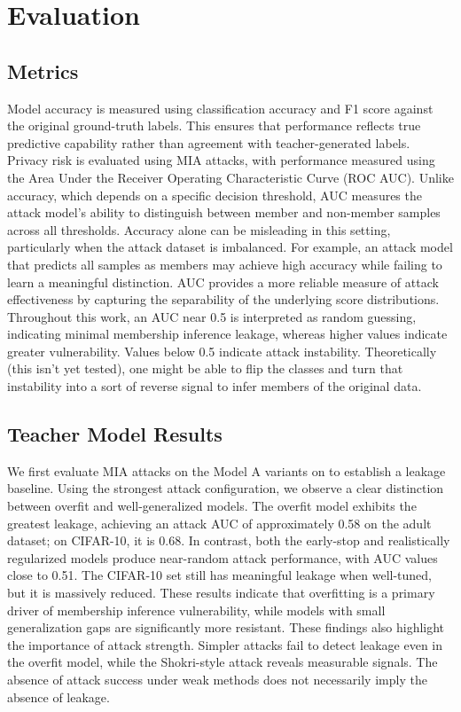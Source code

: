 \documentclass[conference]{IEEEtran}
\begin{document}
\section{Evaluation}

\subsection{Metrics}
Model accuracy is measured using classification accuracy and F1 score against the original ground-truth labels. This ensures that performance reflects true predictive capability rather than agreement with teacher-generated labels.
Privacy risk is evaluated using MIA attacks, with performance measured using the Area Under the Receiver Operating Characteristic Curve (ROC AUC). Unlike accuracy, which depends on a specific decision threshold, AUC measures the attack model’s ability to distinguish between member and non-member samples across all thresholds.
Accuracy alone can be misleading in this setting, particularly when the attack dataset is imbalanced. For example, an attack model that predicts all samples as members may achieve high accuracy while failing to learn a meaningful distinction. AUC provides a more reliable measure of attack effectiveness by capturing the separability of the underlying score distributions.
Throughout this work, an AUC near 0.5 is interpreted as random guessing, indicating minimal membership inference leakage, whereas higher values indicate greater vulnerability. Values below 0.5 indicate attack instability. Theoretically (this isn’t yet tested), one might be able to flip the classes and turn that instability into a sort of reverse signal to infer members of the original data.

\subsection{Teacher Model Results}
We first evaluate MIA attacks on the Model A variants on to establish a leakage baseline. Using the strongest attack configuration, we observe a clear distinction between overfit and well-generalized models.
The overfit model exhibits the greatest leakage, achieving an attack AUC of approximately 0.58 on the adult dataset; on CIFAR-10, it is 0.68. In contrast, both the early-stop and realistically regularized models produce near-random attack performance, with AUC values close to 0.51. The CIFAR-10 set still has meaningful leakage when well-tuned, but it is massively reduced. These results indicate that overfitting is a primary driver of membership inference vulnerability, while models with small generalization gaps are significantly more resistant.
These findings also highlight the importance of attack strength. Simpler attacks fail to detect leakage even in the overfit model, while the Shokri-style attack reveals measurable signals. The absence of attack success under weak methods does not necessarily imply the absence of leakage.
\end{document}
